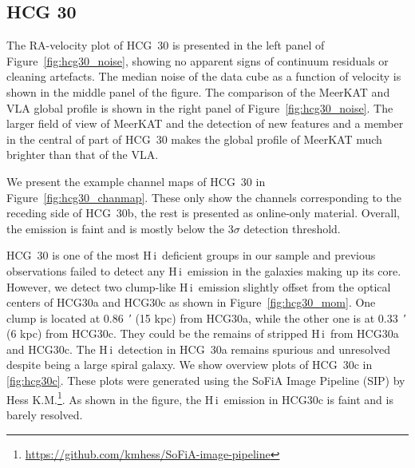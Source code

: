 \documentclass{aa}
\newcommand{\HI}{H\,{\sc i}}
\begin{document}
\subsection{HCG 30}
The RA-velocity plot of HCG~30 is presented in the left panel of Figure~\ref{fig:hcg30_noise}, showing no apparent signs of continuum residuals or cleaning artefacts. 
The median noise of the data cube as a function of velocity is shown in the middle panel of the figure. 
The comparison of the MeerKAT and VLA global profile is shown in the right panel of Figure~\ref{fig:hcg30_noise}. The larger field of view of MeerKAT and the detection of 
new features and a member in the central of part of HCG~30 makes the global profile of MeerKAT much brighter than that of the VLA.    

We present the example channel maps of HCG~30 in Figure~\ref{fig:hcg30_chanmap}. These only show the channels corresponding to the receding side of HCG~30b, the rest is presented 
as online-only material. Overall, the emission is faint and is mostly below the 3$\sigma$ detection threshold.  


HCG~30 is one of the most \HI\ deficient groups in our sample and previous observations failed to detect any \HI\ emission in the galaxies making up its core. However, 
we detect two clump-like \HI\ emission slightly offset from the optical centers of HCG30a and HCG30c as shown in Figure~\ref{fig:hcg30_mom}. 
One clump is located at \SI{0.86}{\arcminute} (15 kpc) from HCG30a, while the other one is at \SI{0.33}{\arcminute} (6 kpc) from HCG30c. They could be 
the remains of stripped \HI\ from HCG30a and HCG30c. The \HI\ detection in HCG~30a remains spurious and unresolved despite being a large spiral galaxy. 
We show overview plots of HCG~30c in \ref{fig:hcg30c}. These plots were generated 
using the SoFiA Image Pipeline (SIP) by Hess K.M.\footnote{\url{https://github.com/kmhess/SoFiA-image-pipeline}}\citep{SIP}. 
As shown in the figure, the \HI\ emission in HCG30c is faint and is barely resolved.   
\end{document}
